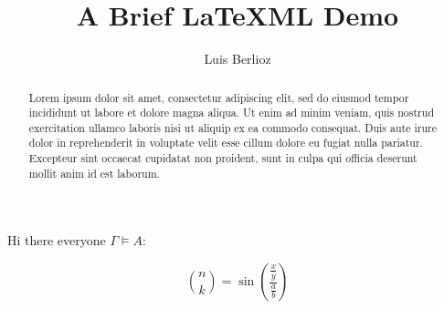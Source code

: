 \documentclass{article}
\title{A Brief LaTeXML Demo}
\author{Luis Berlioz}
\begin{document}
\maketitle

\begin{abstract}
    Lorem ipsum dolor sit amet, consectetur adipiscing elit, sed do eiusmod tempor incididunt ut labore et dolore magna aliqua. Ut enim ad minim veniam, quis nostrud exercitation ullamco laboris nisi ut aliquip ex ea commodo consequat. Duis aute irure dolor in reprehenderit in voluptate velit esse cillum dolore eu fugiat nulla pariatur. Excepteur sint occaecat cupidatat non proident, sunt in culpa qui officia deserunt mollit anim id est laborum.
\end{abstract}

Hi there everyone $\Gamma \models A$: 

$$ {n \choose k} = 
\sin\left( \frac{\frac xy}{\frac ab} \right) $$
\end{document}
